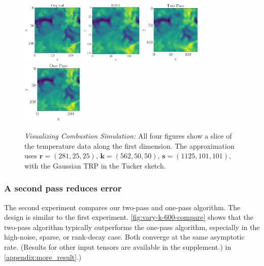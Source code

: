 \begin{figure}[h!]
	\includegraphics[height=3cm]{figure/T100_original.pdf}
	\includegraphics[height=3cm]{figure/T100_hooi.pdf}
	\includegraphics[height=3cm]{figure/T100_2pass.pdf}
	\includegraphics[height=3cm]{figure/T100_1pass.pdf}
	\centering
	\caption{\label{fig:T100}\textit{Visualizing Combustion Simulation:}
	All four figures show a slice of the temperature data along the first dimension.
	The approximation uses
	$\mathbf{r} = (281,25,25)$,
	$\mathbf{k} = (562,50,50)$,
	$\mathbf{s} = (1125, 101, 101)$,
	with the Gaussian TRP in the Tucker sketch.}
\end{figure}

\subsubsection{A second pass reduces error}
The second experiment compares our two-pass and one-pass algorithm.
The design is similar to the first experiment.
\ref{fig:vary-k-600-compare} shows that the two-pass algorithm
typically outperforms the one-pass algorithm,
especially in the high-noise, sparse, or rank-decay case.
Both converge at the same asymptotic rate.
(Results for other input tensors are available
\ifdefined \issupplement
in the supplement.)
\else
in \ref{appendix:more_result}.)
\fi

